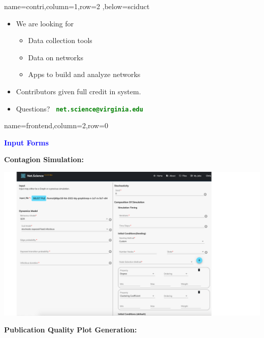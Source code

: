 \documentclass[landscape,paperwidth=70in,paperheight=46in,fontscale=0.225]{baposter} %
\begin{document}
\begin{poster}
          {name=contri,column=1,row=2 ,below=sciduct}{
\begin{itemize}[leftmargin=*,noitemsep,topsep=0pt]
\vspace*{0.13in}
\item We are looking for
\begin{itemize}
\item Data collection tools
\item Data on networks
\item Apps to build and analyze networks
\end{itemize}
\item Contributors given full credit in system.
\medskip
\item Questions?~ \textcolor{green}
        {\textbf{\texttt{net.science@virginia.edu}}}
\end{itemize}
\vspace*{0.2in}
}



          {name=frontend,column=2,row=0}{

\begin{center}
\textcolor{blue}{\large\textbf{Input Forms}}
\end{center}

\textbf{Contagion Simulation:}

\begin{center}
\includegraphics[scale=0.28]{figures/csonnet-model-seeds.pdf}
\end{center}

\textbf{Publication Quality Plot Generation:}

}
\end{poster}
\end{document}

